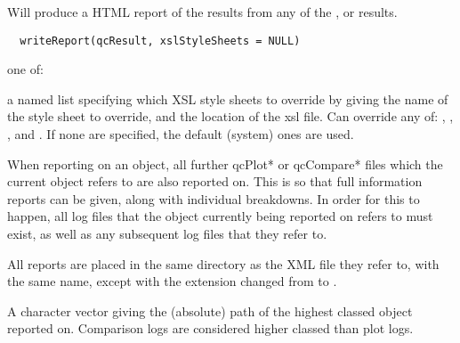 \documentclass[a4paper,oneside]{report}
\begin{document}
\begin{Description}\relax
Will produce a HTML report of the results from any of the
, or  results.
\end{Description}
\begin{Usage}
\begin{verbatim}
  writeReport(qcResult, xslStyleSheets = NULL)
\end{verbatim}
\end{Usage}
\begin{Arguments}
\begin{ldescription}
\item[\code{qcResult}] one of:

\item[\code{xslStyleSheets}] a named list specifying which XSL style sheets
to override by giving the name of the style sheet to override, and
the location of the xsl file. Can override any of:
, ,
, and .
If none are specified, the default (system) ones are used.

\end{ldescription}
\end{Arguments}
\begin{Details}\relax
When reporting on an object, all further qcPlot* or qcCompare* files
which the current object refers to are also reported on. This is so
that full information reports can be given, along with individual
breakdowns. In order for this to happen, all log files that
the object currently being reported on refers to must exist, as well
as any subsequent log files that they refer to.

All reports are placed in the same directory as the XML file they
refer to, with the same name, except with the extension changed from
 to .
\end{Details}
\begin{Value}
A character vector giving the (absolute) path of the highest classed
object reported on. Comparison logs are considered higher classed than
plot logs.
\end{Value}
\end{document}
